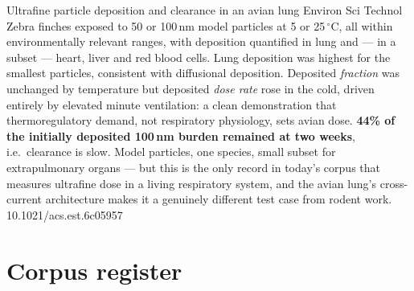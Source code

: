 \documentclass[10pt]{article}
\begin{document}
{Ultrafine particle deposition and clearance in an avian lung}
{Environ Sci Technol}
{Zebra finches exposed to 50 or 100\,nm model particles at 5 or 25\,$^\circ$C, all within
environmentally relevant ranges, with deposition quantified in lung and --- in a subset ---
heart, liver and red blood cells. Lung deposition was highest for the smallest particles,
consistent with diffusional deposition. Deposited \emph{fraction} was unchanged by
temperature but deposited \emph{dose rate} rose in the cold, driven entirely by elevated
minute ventilation: a clean demonstration that thermoregulatory demand, not respiratory
physiology, sets avian dose. \textbf{44\% of the initially deposited 100\,nm burden
remained at two weeks}, i.e.\ clearance is slow. Model particles, one species, small
subset for extrapulmonary organs --- but this is the only record in today's corpus that
measures ultrafine dose in a living respiratory system, and the avian lung's
cross-current architecture makes it a genuinely different test case from rodent work.}
{10.1021/acs.est.6c05957}

\clearpage

\section*{\sffamily\bfseries\color{Deep}Corpus register}
\vspace{-1.5mm}{\color{Amber}\rule{\linewidth}{1.1pt}}\vspace{2.5mm}


\end{document}
